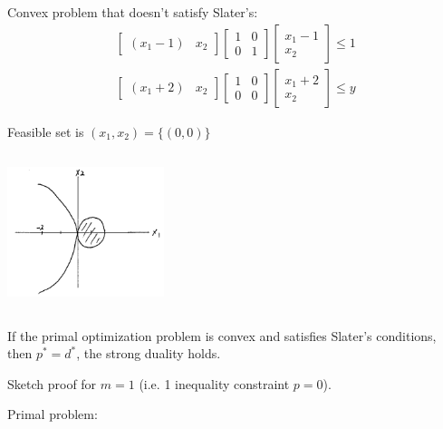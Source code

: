\begin{example}
	Convex problem that doesn't satisfy Slater's:
	\begin{align*}
		\begin{bmatrix}
			(x_1-1) & x_2
		\end{bmatrix}\begin{bmatrix}
			1&0\\
			0&1
		\end{bmatrix}\begin{bmatrix}
			x_1 - 1\\
			x_2
		\end{bmatrix}\leq 1\\
		\begin{bmatrix}
			(x_1+2) & x_2
		\end{bmatrix}\begin{bmatrix}
			1&0\\
			0&0
		\end{bmatrix}\begin{bmatrix}
			x_1 + 2\\
			x_2
		\end{bmatrix}\leq y
	\end{align*}
\end{example}

Feasible set is $(x_1, x_2) = \{(0,0) \}$

\begin{marginfigure}
	\centering
	\includegraphics[width=1.8in,height=1.8in]{figures/ch10/figure1125_1.png}
\end{marginfigure}

\begin{theorem}
	If the primal optimization problem is convex and satisfies Slater's conditions, then $p^* = d^*$, the strong duality holds.
\end{theorem}

Sketch proof for $m = 1$ (i.e. 1 inequality constraint $p = 0$).

Primal problem:

